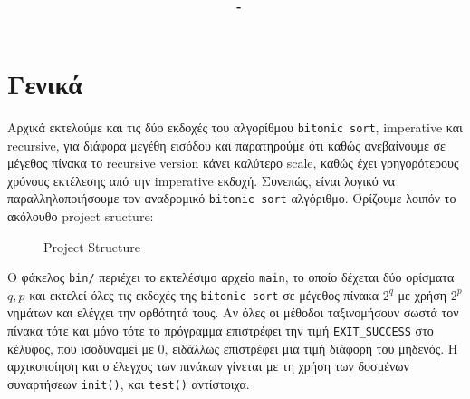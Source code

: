 \documentclass[11pt,a4paper,titlepage]{article}
\title{
	\vspace{5cm}
	\huge{\textbf{\hmwkClass}}\\
	\vspace{9pt}
	\LARGE{\hmwkTitle}\\
	\vspace{7cm}
}
\author{\textbf{\hmwkAuthorName\ - \hmwkAuthorAEM}}
\date{} %
\begin{document}
	
	\maketitle
	
	
	
	
	
	\section{Γενικά}
		Αρχικά εκτελούμε και τις δύο εκδοχές του αλγορίθμου \verb|bitonic sort|, imperative και recursive, για διάφορα μεγέθη εισόδου και παρατηρούμε ότι καθώς ανεβαίνουμε σε μέγεθος πίνακα το recursive version κάνει καλύτερο scale, καθώς έχει γρηγορότερους χρόνους εκτέλεσης από την imperative εκδοχή. Συνεπώς, είναι λογικό να παραλληλοποιήσουμε τον αναδρομικό \verb|bitonic sort| αλγόριθμο. Ορίζουμε λοιπόν το ακόλουθο project sructure:\\
		
		\begin{figure}
			\begin{minipage}[t]{0.4\textwidth}
			\end{minipage}
			\caption{Project Structure}			
		\end{figure}
		
		Ο φάκελος \verb|bin/| περιέχει το εκτελέσιμο αρχείο \verb|main|, το οποίο δέχεται δύο ορίσματα $q,p$ και εκτελεί όλες τις εκδοχές της \verb|bitonic sort| σε μέγεθος πίνακα $2^q$ με χρήση $2^p$ νημάτων και ελέγχει την ορθότητά τους. Αν όλες οι μέθοδοι ταξινομήσουν σωστά τον πίνακα τότε και μόνο τότε το πρόγραμμα επιστρέφει την τιμή \verb|EXIT_SUCCESS| στο κέλυφος, που ισοδυναμεί με 0, ειδάλλως επιστρέφει μια τιμή διάφορη του μηδενός. Η αρχικοποίηση και ο έλεγχος των πινάκων γίνεται με τη χρήση των δοσμένων συναρτήσεων \verb|init()|, και \verb|test()| αντίστοιχα.\\
		
\end{document}
